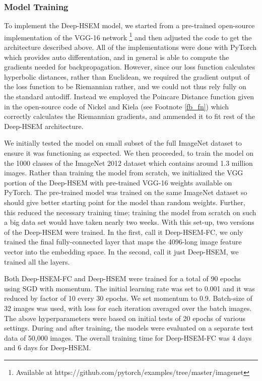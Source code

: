 \documentclass[12pt]{report}
\begin{document}
\subsubsection{Model Training}
To implement the Deep-HSEM model, we started from a pre-trained open-source implementation of the VGG-16 network \footnote{Available at https://github.com/pytorch/examples/tree/master/imagenet} and then adjusted the code to get the architecture described above. All of the implementations were done with PyTorch \cite{Paszke2017} which provides auto differentation, and in general is able to compute the gradients needed for backpropagation. However, since our loss function calculates hyperbolic distances, rather than Euclidean, we required the gradient output of the loss function to be Riemannian rather, and we could not thus rely fully on the standard autodiff. Instead we employed the Poincare Distance function given in the open-source code of Nickel and Kiela \cite{Nickel2017} (see Footnote \ref{fb_fn}) which correctly calculates the Riemannian gradients, and ammended it to fit rest of the Deep-HSEM architecture.

We initially tested the model on small subset of the full ImageNet dataset to ensure it was functioning as expected. We then proceeded, to train the model on the 1000 classes of the ImageNet 2012 dataset which contains around 1.3 million images. Rather than training the model from scratch, we initialized the VGG portion of the Deep-HSEM with pre-trained VGG-16 weights available on PyTorch. The pre-trained model was trained on the same ImageNet dataset so should give better starting point for the model than random weights. Further, this reduced the necessary training time; training the model from scratch on such a big data set would have taken nearly two weeks. With this set-up, two versions of the Deep-HSEM were trained. In the first, call it Deep-HSEM-FC, we only trained the final fully-connected layer that maps the 4096-long image feature vector into the embedding space. In the second, call it just Deep-HSEM, we trained all the layers.

Both Deep-HSEM-FC and Deep-HSEM were trained for a total of 90 epochs using SGD with momentum. The initial learning rate was set to 0.001 and it was reduced by factor of 10 every 30 epochs. We set momentum to 0.9. Batch-size of 32 images was used, with loss for each iteration averaged over the batch images. The above hyperparameters were based on initial tests of 20 epochs of various settings. During and after training, the models were evaluated on a separate test data of 50,000 images. The overall training time for Deep-HSEM-FC was 4 days and 6 days for Deep-HSEM.
\end{document}
